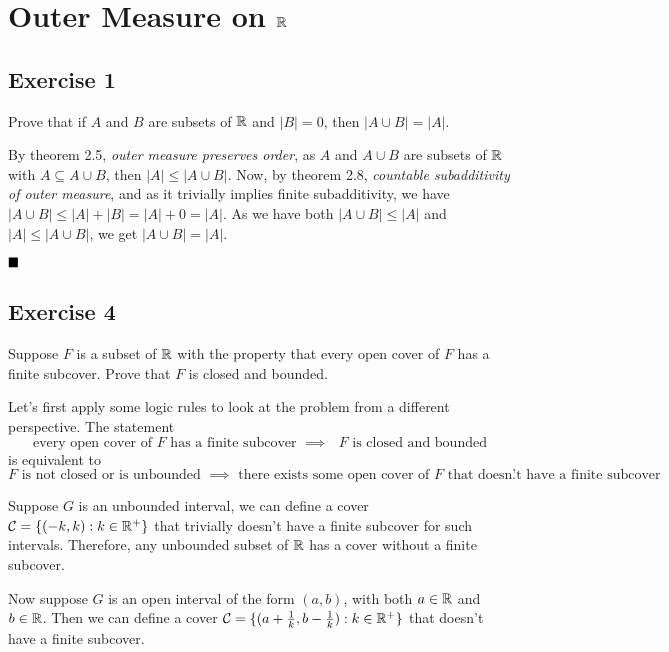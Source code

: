 \section{Outer Measure on $\mathbb{R}$}

\subsection{Exercise 1}

\begin{formulationBox}
	Prove that if $A$ and $B$ are subsets of $\mathbb{R}$ and $|B|=0$, then $|A\cup B| = |A|$.
\end{formulationBox}

By theorem 2.5, \textit{outer measure preserves order}, as $A$ and $A\cup B$ are subsets of $\mathbb{R}$ with $A\subseteq A\cup B$, then $|A| \leq |A\cup B|$.
\newpara
Now, by theorem 2.8, \textit{countable subadditivity of outer measure}, and as it trivially implies finite subadditivity, we have $|A\cup B| \leq |A| + |B| = |A| + 0 = |A|$.
\newpara
As we have both $|A\cup B| \leq |A|$ and $|A| \leq |A\cup B|$, we get $|A\cup B| = |A|$.

$\qed$

\subsection{Exercise 4}

\begin{formulationBox}
	Suppose $F$ is a subset of $\mathbb{R}$ with the property that every open cover of $F$ has a finite subcover. Prove that $F$ is closed and bounded.
\end{formulationBox}

Let's first apply some logic rules to look at the problem from a different perspective. The statement \[\textrm{every open cover of $F$ has a finite subcover $\implies$ $F$ is closed and bounded}\] is equivalent to \[\textrm{$F$ is not closed or is unbounded $\implies$ there exists some open cover of $F$ that doesn't have a finite subcover}.\]

Suppose $G$ is an unbounded interval, we can define a cover $\mathcal{C}=\{(-k, k):k\in\mathbb{R}^+\}$ that trivially doesn't have a finite subcover for such intervals. Therefore, any unbounded subset of $\mathbb{R}$ has a cover without a finite subcover.

Now suppose $G$ is an open interval of the form $(a, b)$, with both $a\in\mathbb{R}$ and $b\in\mathbb{R}$. Then we can define a cover $\mathcal{C}=\{(a+\frac{1}{k}, b-\frac{1}{k}):k\in\mathbb{R}^+\}$ that doesn't have a finite subcover.

